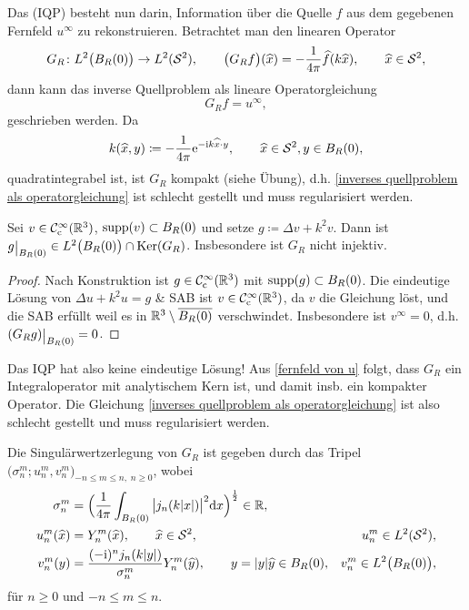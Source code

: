 Das  (IQP) besteht nun darin, Information über die Quelle \(f\) aus dem gegebenen Fernfeld \(u^\infty\) zu rekonstruieren. Betrachtet man den linearen Operator
\begin{equation}
	\label{operator G_R definition}
	G_R\colon L^2\big(B_R(0)\big) \to L^2(\mathcal{S}^2),\qquad\big(G_Rf\big)(\widehat{x})=-\frac{1}{4\pi}\widehat{f}(k\widehat{x}),\qquad\widehat{x}\in\mathcal{S}^2,
\end{equation}
dann kann das inverse Quellproblem als lineare Operatorgleichung
\begin{equation}
	\label{inverses quellproblem als operatorgleichung}
	G_Rf=u^\infty,
\end{equation}
geschrieben werden. Da 
\begin{equation*}
	k(\widehat{x},y)\coloneqq-\frac{1}{4\pi}\mathrm{e}^{-\mathrm{i} k\widehat{x}\cdot y},\qquad \widehat{x}\in\mathcal{S}^2,y\in B_R(0),
\end{equation*}
quadratintegrabel ist, ist \(G_R\) kompakt (siehe Übung), d.h. \eqref{inverses quellproblem als operatorgleichung} ist schlecht gestellt und muss regularisiert werden.
\begin{lem}
	Sei \(v\in\mathcal{C}_{\mathrm{c}}^\infty(\mathbb{R}^3)\), \(\operatorname{supp}(v)\subset B_R(0)\) und setze \(g\coloneqq\Delta v+k^2v\). Dann ist \(g\restrict{B_R(0)}\in L^2\big(B_R(0)\big)\cap\Ker(G_R)\). Insbesondere ist \(G_R\) nicht injektiv.
\end{lem}
\begin{proof}
	Nach Konstruktion ist \(g\in\mathcal{C}_{\mathrm{c}}^\infty(\mathbb{R}^3)\) mit \(\operatorname{supp}(g)\subset B_R(0)\).
	Die eindeutige Lösung von \(\Delta u+k^2 u=g\) \& SAB ist \(v\in\mathcal{C}_{\mathrm{c}}^\infty(\mathbb{R}^3)\), da \(v\) die Gleichung löst, und die SAB erfüllt weil es in \(\mathbb{R}^3\setminus\overline{B_R(0)}\) verschwindet. Insbesondere ist \(v^\infty=0\), d.h. \((G_Rg)\restrict{B_R(0)}=0\).
\end{proof}
Das IQP hat also keine eindeutige Lösung! Aus \eqref{fernfeld von u} folgt, dass \(G_R\) ein Integraloperator mit analytischem Kern ist, und damit insb. ein kompakter Operator. Die Gleichung \eqref{inverses quellproblem als operatorgleichung} ist also schlecht gestellt und muss regularisiert werden.
\begin{satz}[Singulärwertzerlegung]\label{satz: SVD}
	Die Singulärwertzerlegung von \(G_R\) ist gegeben durch das Tripel \(\big(\sigma_n^m;u_n^m,v_n^m\big)_{-n\leq m\leq n,\;n\geq0}\), wobei
	\begin{align*}
		\sigma_n^m&=\Big(\frac{1}{4\pi}\int_{B_R(0)}\big|j_n(k|x|)\big|^2\mathrm{d}x\Big)^\frac{1}{2}\in\mathbb{R},\\
		u_n^m(\widehat{x})&=Y_n^m(\widehat{x}),\qquad \widehat{x}\in\mathcal{S}^2,& u_n^m\in L^2(\mathcal{S}^2),\\
		v_n^m(y)&=\frac{(-\mathrm{i})^nj_n(k|y|)}{\sigma_n^m}Y_n^m(\widehat{y}),\qquad y=|y|\widehat{y}\in B_R(0),& v_n^m\in L^2\big(B_R(0)\big),
	\end{align*}
	für \(n\geq0\) und \(-n\leq m\leq n\).
\end{satz}
